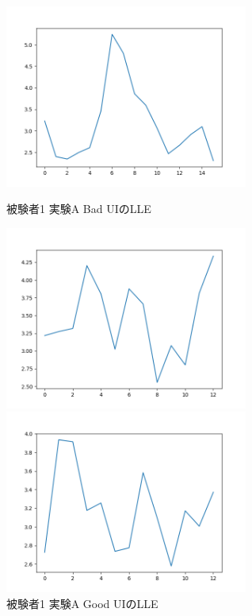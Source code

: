\begin{figure}[htbp]
  \begin{minipage}{0.5\hsize}
    \begin{center}
       \includegraphics[width=80mm]{img/lle/1A-1.png}
    \end{center}
    \caption{被験者1 実験A Bad UIのLLE}
    \label{fig:llea1}
  \end{minipage}
    \begin{minipage}{0.5\hsize}
    \begin{center}
       \includegraphics[width=80mm]{img/lle/1A-2.png}
    \end{center}
    \caption{被験者1 実験A Good UIのLLE}
    \label{fig:llea2}
  \end{minipage}
    \begin{minipage}{0.5\hsize}
    \begin{center}
       \includegraphics[width=80mm]{img/lle/1B-1.png}

\end{center}
\end{minipage}
\end{figure}
